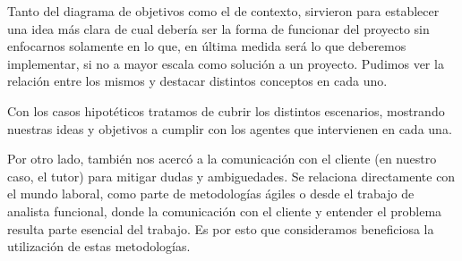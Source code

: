 \documentclass[spanish, 10pt,a4paper]{article}
\numberwithin{equation}{section} %
\begin{document}
	Tanto del diagrama de objetivos como el de contexto, sirvieron para establecer una idea más clara de cual debería ser la forma de funcionar del proyecto sin enfocarnos solamente en lo que, en última medida será lo que deberemos implementar, si no a mayor escala como solución a un proyecto. Pudimos ver la relación entre los mismos y destacar distintos conceptos en cada uno.

	Con los casos hipotéticos tratamos de cubrir los distintos escenarios, mostrando nuestras ideas y objetivos a cumplir con los agentes que intervienen en cada una.
	
	Por otro lado, también nos acercó a la comunicación con el cliente (en nuestro caso, el tutor) para mitigar dudas y ambiguedades. Se relaciona directamente con el mundo laboral, como parte de metodologías ágiles o desde el trabajo de analista funcional, donde la comunicación con el cliente y entender el problema resulta parte esencial del trabajo. Es por esto que consideramos beneficiosa la utilización de estas metodologías.

\end{document}
